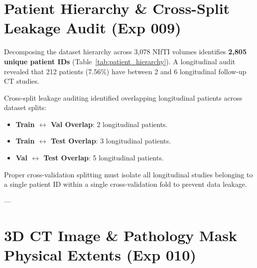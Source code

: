 \documentclass[11pt,a4paper]{article}
\begin{document}
\section{Patient Hierarchy \& Cross-Split Leakage Audit (Exp 009)}

Decomposing the dataset hierarchy across 3,078 NIfTI volumes identifies \textbf{2,805 unique patient IDs} (Table~\ref{tab:patient_hierarchy}). A longitudinal audit revealed that 212 patients (7.56\%) have between 2 and 6 longitudinal follow-up CT studies. 

Cross-split leakage auditing identified overlapping longitudinal patients across dataset splits:
\begin{itemize}
    \item \textbf{Train $\leftrightarrow$ Val Overlap}: 2 longitudinal patients.
    \item \textbf{Train $\leftrightarrow$ Test Overlap}: 3 longitudinal patients.
    \item \textbf{Val $\leftrightarrow$ Test Overlap}: 5 longitudinal patients.
\end{itemize}
Proper cross-validation splitting must isolate all longitudinal studies belonging to a single patient ID within a single cross-validation fold to prevent data leakage.

\begin{table}[H]
\centering
\caption{3-tier dataset hierarchy breakdown across Train, Validation, and Test splits.}
\label{tab:patient_hierarchy}
\small
{}
\end{table}

---

\section{3D CT Image \& Pathology Mask Physical Extents (Exp 010)}
\end{document}
